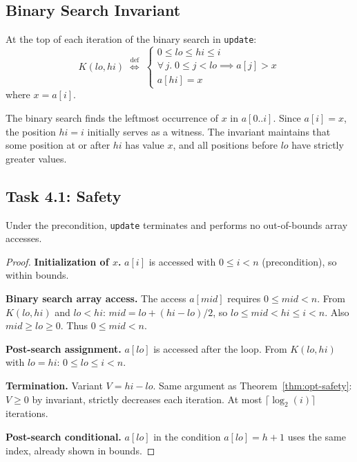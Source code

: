 \subsection{Binary Search Invariant}

\begin{invariant}\label{inv:update-search}
At the top of each iteration of the binary search in \texttt{update}:
\[
  K(\mathit{lo}, \mathit{hi}) \;\stackrel{\text{def}}{\iff}\;
  \begin{cases}
    0 \leq \mathit{lo} \leq \mathit{hi} \leq i \\
    \forall\, j.\; 0 \leq j < \mathit{lo} \implies a[j] > x \\
    a[\mathit{hi}] = x
  \end{cases}
\]
where $x = a[i]$.
\end{invariant}

\begin{remark}
The binary search finds the leftmost occurrence of $x$ in $a[0..i]$.
Since $a[i] = x$, the position $\mathit{hi} = i$ initially serves as a witness.
The invariant maintains that some position at or after $\mathit{hi}$ has value $x$,
and all positions before $\mathit{lo}$ have strictly greater values.
\end{remark}

\subsection{Task 4.1: Safety}

\begin{theorem}\label{thm:update-safety}
Under the precondition, \texttt{update} terminates and performs no out-of-bounds
array accesses.
\end{theorem}

\begin{proof}
\textbf{Initialization of $x$.}
$a[i]$ is accessed with $0 \leq i < n$ (precondition), so within bounds.

\textbf{Binary search array access.}
The access $a[\mathit{mid}]$ requires $0 \leq \mathit{mid} < n$.
From $K(\mathit{lo}, \mathit{hi})$ and $\mathit{lo} < \mathit{hi}$:
$\mathit{mid} = \mathit{lo} + (\mathit{hi} - \mathit{lo})/2$,
so $\mathit{lo} \leq \mathit{mid} < \mathit{hi} \leq i < n$.
Also $\mathit{mid} \geq \mathit{lo} \geq 0$. Thus $0 \leq \mathit{mid} < n$.

\textbf{Post-search assignment.}
$a[\mathit{lo}]$ is accessed after the loop. From $K(\mathit{lo}, \mathit{hi})$ with
$\mathit{lo} = \mathit{hi}$: $0 \leq \mathit{lo} \leq i < n$.

\textbf{Termination.}
Variant $V = \mathit{hi} - \mathit{lo}$. Same argument as Theorem~\ref{thm:opt-safety}:
$V \geq 0$ by invariant, strictly decreases each iteration. At most $\lceil\log_2(i)\rceil$ iterations.

\textbf{Post-search conditional.}
$a[\mathit{lo}]$ in the condition $a[\mathit{lo}] = h + 1$ uses the same index, already shown in bounds.
\end{proof}

